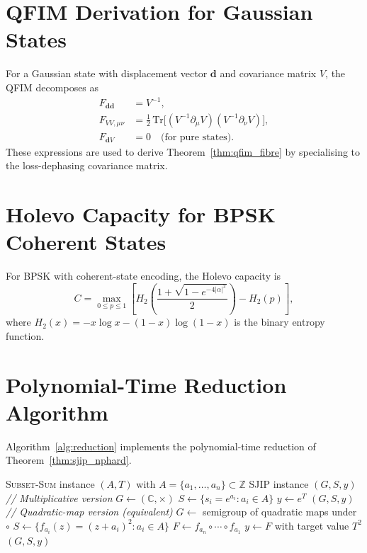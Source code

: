 \documentclass[journal,twocolumn]{IEEEtran}
\theoremstyle{definition}
\theoremstyle{plain}
\newcommand{\C}{\mathbb{C}}
\newcommand{\Z}{\mathbb{Z}}
\newcommand{\Tr}{\mathrm{Tr}}
\begin{document}
\appendices

\section{QFIM Derivation for Gaussian States}
\label{app:qfim}

For a Gaussian state with displacement vector $\mathbf{d}$ and
covariance matrix $V$, the QFIM decomposes as
\begin{align}
  F_{\mathbf{d}\mathbf{d}} &= V^{-1}, \label{eq:Fdd}\\
  F_{VV,\mu\nu} &= \tfrac{1}{2}\,\Tr\!\bigl[(V^{-1}\partial_\mu V)
    (V^{-1}\partial_\nu V)\bigr], \label{eq:FVV}\\
  F_{\mathbf{d}V} &= 0 \quad \text{(for pure states)}. \label{eq:FdV}
\end{align}
These expressions are used to derive Theorem~\ref{thm:qfim_fibre} by
specialising to the loss-dephasing covariance matrix.

\section{Holevo Capacity for BPSK Coherent States}
\label{app:holevo_bpsk}

For BPSK with coherent-state encoding, the Holevo capacity is
\begin{equation}
  C = \max_{0 \le p \le 1}\!\left[
    H_2\!\left(\frac{1+\sqrt{1-e^{-4|\alpha|^2}}}{2}\right)
    - H_2(p)\right],
  \label{eq:C_BPSK_appendix}
\end{equation}
where $H_2(x) = -x\log x - (1-x)\log(1-x)$ is the binary entropy
function.

\section{Polynomial-Time Reduction Algorithm}
\label{app:reduction}

Algorithm~\ref{alg:reduction} implements the polynomial-time
reduction of Theorem~\ref{thm:sjip_nphard}.

\begin{algorithm}[H]
\caption{Polynomial-Time Reduction: \textsc{Subset-Sum} to SJIP}
\label{alg:reduction}
\begin{algorithmic}[1]
\Require \textsc{Subset-Sum} instance $(A, T)$ with
         $A = \{a_1,\ldots,a_n\} \subset \Z$
\Ensure SJIP instance $(G, S, y)$
\State \textit{// Multiplicative version}
\State $G \leftarrow (\C, \times)$
\State $S \leftarrow \{s_i = e^{a_i} : a_i \in A\}$
\State $y \leftarrow e^T$
\Return $(G, S, y)$
\State \textit{// Quadratic-map version (equivalent)}
\State $G \leftarrow$ semigroup of quadratic maps under $\circ$
\State $S \leftarrow \{f_{a_i}(z) = (z+a_i)^2 : a_i \in A\}$
\State $F \leftarrow f_{a_n} \circ \cdots \circ f_{a_1}$
\State $y \leftarrow F$ with target value $T^2$
\Return $(G, S, y)$
\end{algorithmic}
\end{algorithm}
\end{document}
